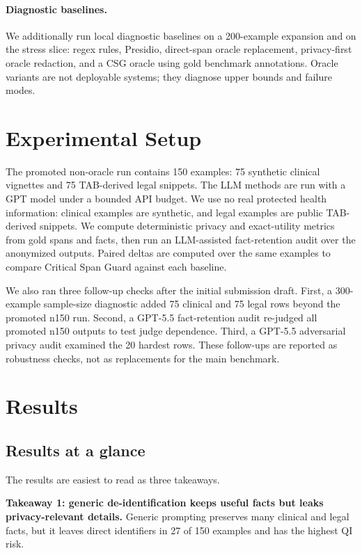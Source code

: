 \documentclass{article}
\newcommand{\method}{Critical Span Guard}
\begin{document}
\paragraph{Diagnostic baselines.}
We additionally run local diagnostic baselines on a 200-example expansion and on
the stress slice: regex rules, Presidio, direct-span oracle replacement,
privacy-first oracle redaction, and a CSG oracle using gold benchmark
annotations.  Oracle variants are not deployable systems; they diagnose upper
bounds and failure modes.

\section{Experimental Setup}

The promoted non-oracle run contains 150 examples: 75 synthetic clinical
vignettes and 75 TAB-derived legal snippets.  The LLM methods are run with a GPT
model under a bounded API budget.  We use no real protected health information:
clinical examples are synthetic, and legal examples are public TAB-derived
snippets.  We compute deterministic privacy and exact-utility metrics from gold
spans and facts, then run an LLM-assisted fact-retention audit over the
anonymized outputs.  Paired deltas are computed over the same examples to compare
\method{} against each baseline.

We also ran three follow-up checks after the initial submission draft.  First, a
300-example sample-size diagnostic added 75 clinical and 75 legal rows beyond the
promoted n150 run.  Second, a GPT-5.5 fact-retention audit re-judged all
promoted n150 outputs to test judge dependence.  Third, a GPT-5.5 adversarial
privacy audit examined the 20 hardest rows.  These follow-ups are reported as
robustness checks, not as replacements for the main benchmark.

\section{Results}

\subsection{Results at a glance}

The results are easiest to read as three takeaways.

\textbf{Takeaway 1: generic de-identification keeps useful facts but leaks
privacy-relevant details.}  Generic prompting preserves many clinical and legal
facts, but it leaves direct identifiers in 27 of 150 examples and has the highest
QI risk.
\end{document}
